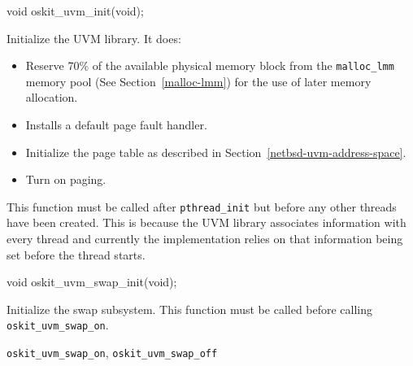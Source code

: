 \begin{apisyn}

        \funcproto void oskit_uvm_init(void);
\end{apisyn}
\begin{apidesc}
        Initialize the UVM library.  It does:

        \begin{itemize}
        \item Reserve 70\% of the available physical memory block
        from the {\tt malloc_lmm} memory pool (See
        Section~\ref{malloc-lmm}) for the use of later memory
        allocation.

        \item Installs a default page fault handler.

        \item Initialize the page table as described in
        Section~\ref{netbsd-uvm-address-space}.

        \item Turn on paging.

        \end{itemize}

        This function must be called after \texttt{pthread_init}
        but before any other threads have been created.
        This is because the \oskit{} UVM library associates
        information with every
        thread and currently the implementation relies on that
        information being set before the thread starts.

\end{apidesc}

\begin{apisyn}

        \funcproto void oskit_uvm_swap_init(void);
\end{apisyn}
\begin{apidesc}
        Initialize the swap subsystem.  This function must be called
        before calling \texttt{oskit_uvm_swap_on}.
\end{apidesc}
\begin{apirel}
        {\tt oskit_uvm_swap_on}, {\tt oskit_uvm_swap_off}
\end{apirel}

